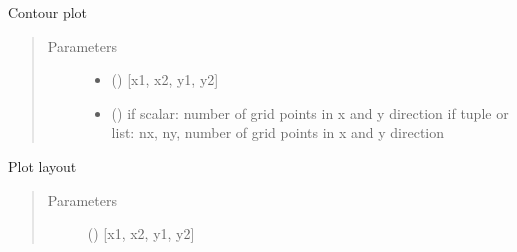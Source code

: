 \documentclass[letterpaper,10pt,english]{sphinxmanual}
\begin{document}
\begin{fulllineitems}
\begin{fulllineitems}
\end{fulllineitems}


\begin{fulllineitems}
\label{\detokenize{models/model:timml.model.Model.contour}}
Contour plot
\begin{quote}\begin{description}
\item[{Parameters}] \leavevmode\begin{itemize}
\item {} 
 () \textendash{} {[}x1, x2, y1, y2{]}

\item {} 
 (\sphinxstyleliteralemphasis{, }) \textendash{} if scalar: number of grid points in x and y direction
if tuple or list: nx, ny, number of grid points in x and y direction

\end{itemize}

\end{description}\end{quote}

\end{fulllineitems}


\begin{fulllineitems}
\label{\detokenize{models/model:timml.model.Model.plot}}
Plot layout
\begin{quote}\begin{description}
\item[{Parameters}] \leavevmode
{} () \textendash{} {[}x1, x2, y1, y2{]}


\end{description}
\end{quote}
\end{fulllineitems}
\end{fulllineitems}
\end{document}
